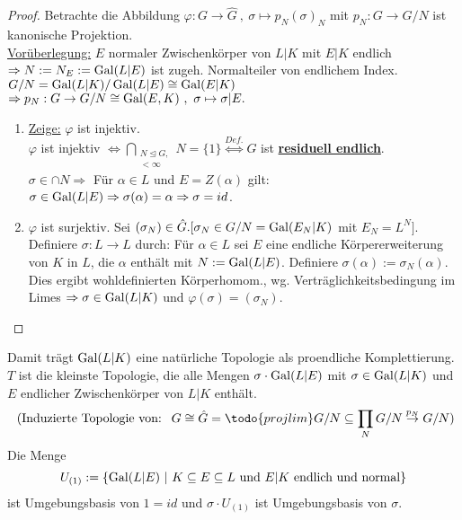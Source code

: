 

\begin{proof}
Betrachte die Abbildung $\varphi: G \to \hat{G} \ , \ \sigma \mapsto p_N(\sigma)_N$ mit $p_N: G \to G/N$ ist kanonische Projektion.\\
\underline{Vorüberlegung:} $E$ normaler Zwischenkörper von $L|K$ mit $E|K$ endlich\\
$\Rightarrow N:=N_E:=\operatorname{Gal}(L|E)$ ist zugeh. Normalteiler von endlichem Index. $G/N= \operatorname{Gal}(L|K)/\operatorname{Gal}(L|E) \cong \operatorname{Gal}(E|K)$\\
$\Rightarrow p_N: G \to G/N \cong \Gal(E,K) \ , \ \sigma \mapsto \sigma|E.$\\
\begin{enumerate}[(1)]
\item \underline{Zeige:} $\varphi$ ist injektiv.\\
$\varphi$ ist injektiv $\iff \bigcap \limits_{\substack{ N \trianglelefteq G,\\ [G:N] < \infty}} N = \{1\} \stackrel{Def.}{\iff} G$ ist \underline{\textbf{residuell endlich}}.\\
$\sigma \in \cap N \Rightarrow$ Für $\alpha \in L$ und $E=Z(\alpha)$ gilt: $\sigma \in \operatorname{Gal}(L|E) \Rightarrow \sigma(\alpha)=\alpha \Rightarrow \sigma=id$.
\item $\varphi$ ist surjektiv. Sei $(\sigma_N) \in \hat{G}. [\sigma_N \in G/N = \operatorname{Gal}(E_N|K)$ mit $E_N=L^N]$.\\
Definiere $\sigma : L \to L$ durch: Für $\alpha \in L$ sei $E$ eine endliche Körpererweiterung von $K$ in $L$, die $\alpha$ enthält mit $N:= \operatorname{Gal}(L|E)$. Definiere $\sigma(\alpha):=\sigma_N(\alpha)$. Dies ergibt wohldefinierten Körperhomom., wg. Verträglichkeitsbedingung im Limes $\Rightarrow \sigma \in \operatorname{Gal}(L|K)$ und $\varphi(\sigma)=(\sigma_N)$.
\end{enumerate}
\end{proof}

\begin{Bem}
Damit trägt $\operatorname{Gal}(L|K)$ eine natürliche Topologie als proendliche Komplettierung. $T$ ist die kleinste Topologie, die alle Mengen $\sigma \cdot \operatorname{Gal}(L|E)$ mit $\sigma  \in \operatorname{Gal}(L|K)$ und $E$ endlicher Zwischenkörper von $L|K$ enthält. 
\[\text{ (Induzierte Topologie von: \ } G \cong \hat{G} = \todo{projlim} G/N \subseteq \prod_N G/N \stackrel{p_N}{\to} G/N)\]
Die Menge
\[U_{(1)} := \{\operatorname{Gal}(L|E) \ | \ K \subseteq E \subseteq L \text{ und } E|K \text{ endlich und normal} \}\]
ist Umgebungsbasis von $1=id$ und $\sigma \cdot U_{(1)}$ ist Umgebungsbasis von $\sigma$.
\end{Bem}


